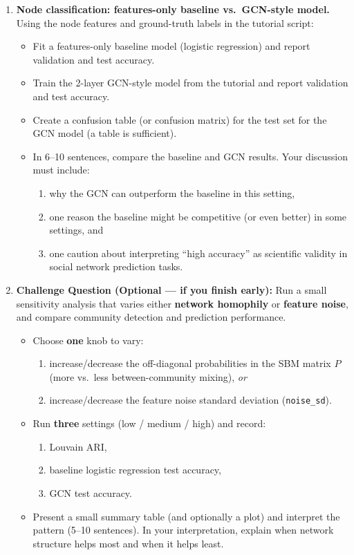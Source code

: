 \documentclass[11pt]{article}
\begin{document}
\begin{enumerate}
\item \textbf{Node classification: features-only baseline vs.\ GCN-style model.}
Using the node features and ground-truth labels in the tutorial script:
\begin{itemize}
  \item Fit a features-only baseline model (logistic regression) and report validation and test accuracy.
  \item Train the 2-layer GCN-style model from the tutorial and report validation and test accuracy.
  \item Create a confusion table (or confusion matrix) for the test set for the GCN model (a table is sufficient).
  \item In 6--10 sentences, compare the baseline and GCN results. Your discussion must include:
  \begin{enumerate}
    \item why the GCN can outperform the baseline in this setting,
    \item one reason the baseline might be competitive (or even better) in some settings, and
    \item one caution about interpreting ``high accuracy'' as scientific validity in social network prediction tasks.
  \end{enumerate}
\end{itemize}

\item \textbf{Challenge Question (Optional --- if you finish early):}
Run a small sensitivity analysis that varies either \textbf{network homophily} or \textbf{feature noise}, and compare community detection and prediction performance.
\begin{itemize}
  \item Choose \textbf{one} knob to vary:
  \begin{enumerate}
    \item increase/decrease the off-diagonal probabilities in the SBM matrix $P$ (more vs.\ less between-community mixing), \emph{or}
    \item increase/decrease the feature noise standard deviation (\texttt{noise\_sd}).
  \end{enumerate}
  \item Run \textbf{three} settings (low / medium / high) and record:
  \begin{enumerate}
    \item Louvain ARI,
    \item baseline logistic regression test accuracy,
    \item GCN test accuracy.
  \end{enumerate}
  \item Present a small summary table (and optionally a plot) and interpret the pattern (5--10 sentences). In your interpretation, explain when network structure helps most and when it helps least.
\end{itemize}

\end{enumerate}
\end{document}
